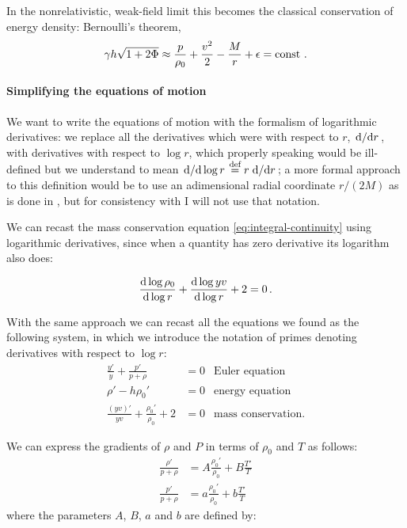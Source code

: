\documentclass[main.tex]{subfiles}
\begin{document}
In the nonrelativistic, weak-field limit this becomes the classical conservation of energy density: Bernoulli's theorem,
%
\begin{equation}
    \gamma h \sqrt{1+2\Phi} \approx \frac{p}{\rho_0} + \frac{v^2}{2} - \frac{M}{r} + \epsilon = \const \,.
\end{equation}

\paragraph{Simplifying the equations of motion} \label{par:adiabatic-equations-of-motion}

We want to write the equations of motion with the formalism of logarithmic derivatives: we replace all the derivatives which were with respect to \(r\),  \(\dv*{}{r} \), with derivatives with respect to \(\log r \), which properly speaking would be ill-defined but we understand to mean \(\dv*{}{\log r} \stackrel{\text{def}}{=} r \dv*{}{r} \); a more formal approach to this definition would be to use an adimensional radial coordinate \(r/(2M)\) as is done in \cite[]{NobiliTurollaZampieri:1991dec}, but for consistency with \cite[]{Nobili:2000} I will not use that notation.

We can recast the mass conservation equation \eqref{eq:integral-continuity} using logarithmic derivatives, since when a quantity has zero derivative its logarithm also does:

\begin{equation} \label{eq:differential-continuity}
  \dv{\log \rho_0}{\log r} +
  \dv{\log yv}{\log r} + 2 = 0 \,.
\end{equation}

With the same approach we can recast all the equations we found as the following system, in which we introduce the notation of primes denoting derivatives with respect to \(\log r\):
%
\begin{subequations}
\begin{align}
  \frac{y'}{y} + \frac{p'}{p + \rho}  &= 0 & \text{Euler equation} \label{eq:accretion-euler}  \\
  \rho' - h \rho_0' &= 0  & \text{energy equation}  \label{eq:accretion-energy}\\
  \frac{(yv)'}{yv} + \frac{\rho_0'}{\rho_0} + 2 &=0 & \text{mass conservation.}  \label{eq:accretion-mass}
\end{align}
\end{subequations}

We can express the gradients of \(\rho\) and \(P\) in terms of \(\rho_0\) and \(T\) as follows:
%
\begin{subequations}
\begin{align}
  \frac{\rho'}{p+ \rho}  &= A \frac{\rho_0'}{\rho_0}
      + B \frac{T'}{T} \\
  \frac{p'}{p+ \rho}  &= a \frac{\rho_0'}{\rho_0}
      + b \frac{T'}{T}
\end{align}
\end{subequations}
%
where the parameters \(A\), \(B\), \(a\) and \(b\) are defined by:
\end{document}
